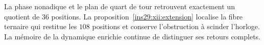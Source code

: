 La phase nonadique et le plan de quart de tour retrouvent exactement un
quotient de \(36\) positions. La proposition~\ref{ins29:xii:extension}
localise la fibre ternaire qui restitue les \(108\) positions et conserve
l’obstruction à scinder l’horloge. La mémoire de la dynamique enrichie
continue de distinguer ses retours complets.

